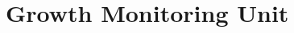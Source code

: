 \documentclass[../../main]{subfiles}
\begin{document}
\section{Growth Monitoring Unit} \label{sec:}
\end{document}
